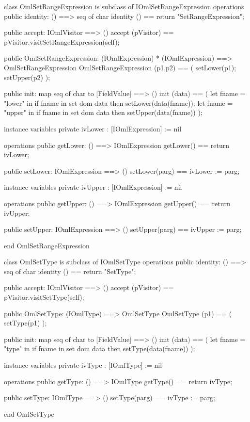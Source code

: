 \begin{vdm_al}
class OmlSetRangeExpression is subclass of IOmlSetRangeExpression
operations
  public identity: () ==> seq of char
  identity () == return "SetRangeExpression";

  public accept: IOmlVisitor ==> ()
  accept (pVisitor) == pVisitor.visitSetRangeExpression(self);

  public OmlSetRangeExpression:
      (IOmlExpression) *
      (IOmlExpression) ==> OmlSetRangeExpression
  OmlSetRangeExpression (p1,p2) == 
   ( setLower(p1);
     setUpper(p2) );

  public init: map seq of char to [FieldValue] ==> ()
  init (data) ==
    ( let fname = "lower" in
        if fname in set dom data
        then setLower(data(fname));
      let fname = "upper" in
        if fname in set dom data
        then setUpper(data(fname)) );

instance variables
  private ivLower : [IOmlExpression] := nil

operations
  public getLower: () ==> IOmlExpression
  getLower() == return ivLower;

  public setLower: IOmlExpression ==> ()
  setLower(parg) == ivLower := parg;

instance variables
  private ivUpper : [IOmlExpression] := nil

operations
  public getUpper: () ==> IOmlExpression
  getUpper() == return ivUpper;

  public setUpper: IOmlExpression ==> ()
  setUpper(parg) == ivUpper := parg;

end OmlSetRangeExpression
\end{vdm_al}

\begin{vdm_al}
class OmlSetType is subclass of IOmlSetType
operations
  public identity: () ==> seq of char
  identity () == return "SetType";

  public accept: IOmlVisitor ==> ()
  accept (pVisitor) == pVisitor.visitSetType(self);

  public OmlSetType:
      (IOmlType) ==> OmlSetType
  OmlSetType (p1) == 
   ( setType(p1) );

  public init: map seq of char to [FieldValue] ==> ()
  init (data) ==
    ( let fname = "type" in
        if fname in set dom data
        then setType(data(fname)) );

instance variables
  private ivType : [IOmlType] := nil

operations
  public getType: () ==> IOmlType
  getType() == return ivType;

  public setType: IOmlType ==> ()
  setType(parg) == ivType := parg;

end OmlSetType
\end{vdm_al}

